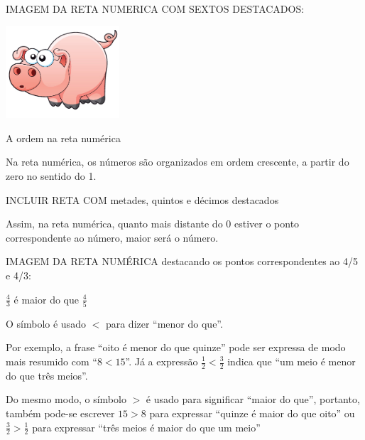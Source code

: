 \documentclass[a4,12pt]{book}
\begin{document}
\begin{imagem*}[breakable]{}{}    IMAGEM DA RETA NUMERICA COM SEXTOS DESTACADOS:

    \includegraphics[width=120pt, keepaspectratio]{pig}

\end{imagem*}

A ordem na reta numérica\mbox{} \newline

Na reta numérica, os números são organizados em ordem crescente, a partir do zero no sentido do 1.

\begin{imagem*}[breakable]{}{}   INCLUIR RETA COM metades, quintos e décimos destacados \end{imagem*}

Assim, na reta numérica, quanto mais distante do 0 estiver o ponto correspondente ao número, maior será o número.

\begin{imagem*}[breakable]{}{}    IMAGEM DA RETA NUMÉRICA destacando os pontos correspondentes ao 4/5 e 4/3:

\end{imagem*}

$\frac{4}{3}$ é maior do que $\frac{4}{5}$\mbox{} \newline


O símbolo é usado $<$ para dizer ``menor do que''.\mbox{} \newline

Por exemplo, a frase ``oito é menor do que quinze'' pode ser expressa de modo mais resumido com ``$8<15$''. Já a expressão $\frac{1}{2}<\frac{3}{2}$ indica que ``um meio é menor do que três meios''. \mbox{} \newline

Do mesmo modo, o símbolo $>$ é usado para significar ``maior do que'', portanto, também pode-se escrever $15>8$ para expressar ``quinze é maior do que oito'' ou $\frac{3}{2}>\frac{1}{2}$  para expressar ``três meios é maior do que um meio''
\end{document}
